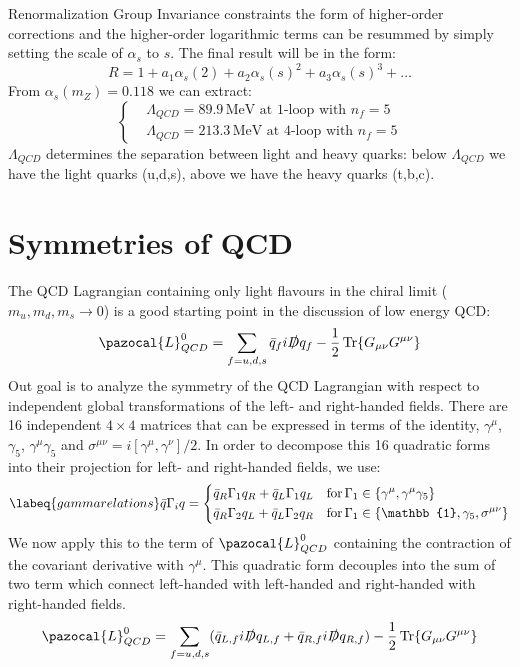 \documentclass[../main.tex]{subfiles}
\begin{document}
Renormalization Group Invariance constraints the form of higher-order corrections and the higher-order logarithmic terms can be resummed by simply setting the scale of $\alpha_s$ to $s$. The final result will be in the form:
\[
R=1+a_1\alpha_s(2)+a_2\alpha_s(s)^2+a_3\alpha_s(s)^3+\dots
\]
From $\alpha_s(m_Z)=0.118$ we can extract:
\[
\left\{
\begin{aligned}
&\Lambda_{QCD}=89.9\,\text{MeV at 1-loop with $n_f=5$}\\
&\Lambda_{QCD}=213.3\,\text{MeV at 4-loop with $n_f=5$}
\end{aligned}
\right.
\]
$\Lambda_{QCD}$ determines the separation between light and heavy quarks: below $\Lambda_{QCD}$ we have the light quarks (u,d,s), above we have the heavy quarks (t,b,c).
\section{Symmetries of QCD}
The QCD Lagrangian containing only light flavours in the chiral limit ($m_u,m_d,m_s\to0$) is a good starting point in the discussion of low energy QCD:
\[
\pazocal{L}_{QCD}^0=\sum_{f=u,d,s}\Bar{q}_fi\slashed{D}q_f-\frac{1}{2}\Tr{G_{\mu\nu}G^{\mu\nu}}
\]
Out goal is to analyze the symmetry of the QCD Lagrangian with respect to independent global transformations of the left- and right-handed fields. There are 16 independent $4\times4$ matrices that can be expressed in terms of the identity, $\gamma^\mu$, $\gamma_5$, $\gamma^\mu\gamma_5$ and $\sigma^{\mu\nu}=i[\gamma^\mu,\gamma^\nu]/2$. In order to decompose this 16 quadratic forms into their projection for left- and right-handed fields, we use:
\begin{equation}
\labeq{gammarelations}
\Bar{q}\Gamma_iq=\left\{
\begin{aligned}
&\Bar{q}_R\Gamma_1q_R+\Bar{q}_L\Gamma_1q_L \quad \text{for}\,\Gamma_1\in\{\gamma^\mu,\gamma^\mu\gamma_5\}\\
&\Bar{q}_R\Gamma_2q_L+\Bar{q}_L\Gamma_2q_R \quad \text{for}\,\Gamma_1\in\{\mathbb{1},\gamma_5,\sigma^{\mu\nu}\}
\end{aligned}
\right.
\end{equation}
We now apply this to the term of $\pazocal{L}_{QCD}^0$ containing the contraction of the covariant derivative with $\gamma^\mu$. This quadratic form decouples into the sum of two term which connect left-handed with left-handed and right-handed with right-handed fields.
\[
\pazocal{L}_{QCD}^0=\sum_{f=u,d,s}(\Bar{q}_{L,f}i\slashed{D}q_{L,f}+\Bar{q}_{R,f}i\slashed{D}q_{R,f})-\frac{1}{2}\Tr{G_{\mu\nu}G^{\mu\nu}}
\]
\end{document}
